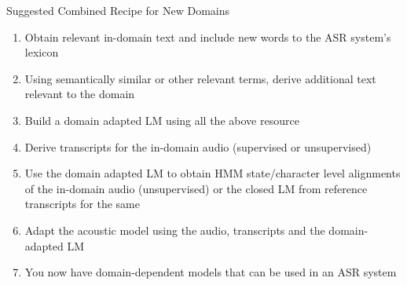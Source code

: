 \begin{frame} {Suggested Combined Recipe for New Domains}
\begin{enumerate}
\item Obtain relevant in-domain text and include new words to the ASR system's lexicon
\item Using semantically similar or other relevant terms, derive additional text relevant to the domain
\item Build a domain adapted LM using all the above resource
\item Derive transcripts for the in-domain audio (supervised or unsupervised)
\item Use the domain adapted LM to obtain HMM state/character level alignments  of the in-domain audio (unsupervised) or the closed LM from reference transcripts for the same
\item Adapt the acoustic model using the audio, transcripts and the domain-adapted LM
\item You now have domain-dependent models that can be used in an ASR system
\end{enumerate}
\end{frame}


